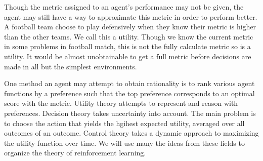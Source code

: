 \documentclass{report}
\begin{document}
Though the metric assigned to an agent's performance may not be given, the agent may still have a way to approximate this metric in order to perform better. A football team choose to play defensively when they know their metric is higher than the other teams. We call this a utility. 
Though we know the current metric in some problems in football match, this is not the fully calculate metric so is a utility. It would be almost unobtainable to get a full metric before decisions are made in all but the simplest environments.

One method an agent may attempt to obtain rationality is to rank various agent functions by a preference such that the top preference corresponds to an optimal score with the metric. Utility theory attempts to represent and reason with preferences. Decision theory takes uncertainty into account. The main problem is to choose the action that yields the hgihest expected utility, averaged over all outcomes of an outcome. Control theory takes a dynamic approach to maximizing the utility function over time. We will use many the ideas from these fields to organize the theory of reinforcement learning.
\end{document}
